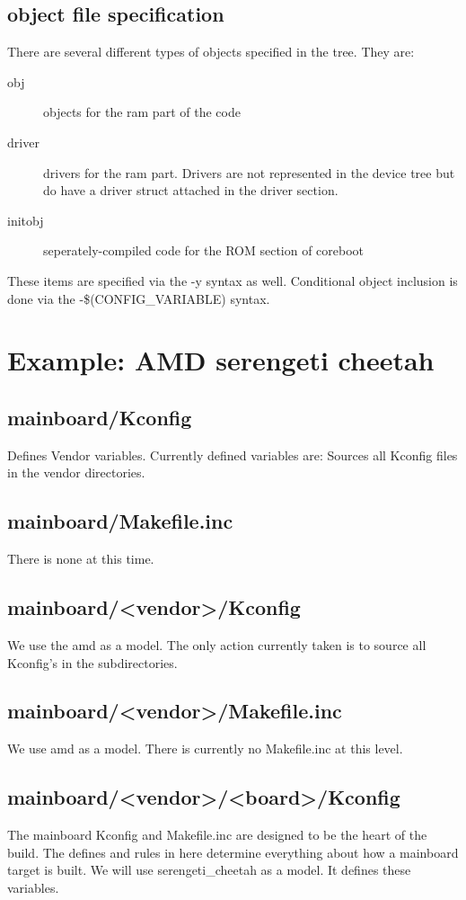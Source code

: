 \documentclass[10pt,letterpaper]{article}
\begin{document}
\subsection{object file specification}
There are several different types of objects specified in the tree. They are: 
\begin{description}
\item[obj]objects for the ram part of the code
\item[driver]drivers for the ram part. Drivers are not represented in the device tree but do have a driver struct attached in the driver section. 
\item[initobj]seperately-compiled code for the ROM section of coreboot
\end{description}
These items are specified via the -y syntax as well. Conditional object inclusion is done via the -\$(CONFIG\_VARIABLE) syntax. 

\section{Example: AMD serengeti cheetah}
\subsection{mainboard/Kconfig}
Defines Vendor variables. Currently defined variables are: 
Sources all Kconfig files in the vendor directories. 

\subsection{mainboard/Makefile.inc}
There is none at this time.
\subsection{mainboard/<vendor>/Kconfig}
We use the amd as a model. The only action currently taken is to source all Kconfig's in the 
subdirectories. 
\subsection{mainboard/<vendor>/Makefile.inc}
We use amd as a model. There is currently no Makefile.inc at this level. 
\subsection{mainboard/<vendor>/<board>/Kconfig}
The mainboard Kconfig and Makefile.inc are designed to be the heart of the build. The defines 
and rules in here determine everything about how a mainboard target is built. 
We will use serengeti\_cheetah as a model. It defines these variables. 

\end{document}
